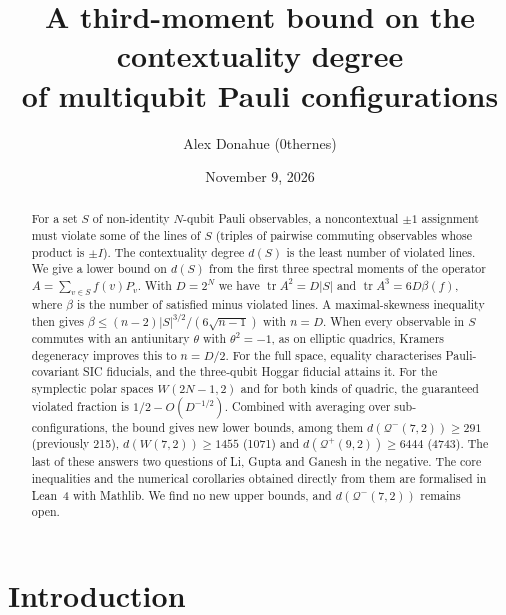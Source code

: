 \documentclass[aps,pra,onecolumn,11pt,superscriptaddress,nofootinbib]{revtex4-2}
\theoremstyle{definition}
\theoremstyle{remark}
\newcommand{\tr}{\operatorname{tr}}
\newcommand{\Qp}{\mathcal{Q}^{+}}
\newcommand{\Qm}{\mathcal{Q}^{-}}
\begin{document}
\title{A third-moment bound on the contextuality degree\\ of multiqubit Pauli configurations}

\author{Alex Donahue (0thernes)}

\date{November 9, 2026}

\begin{abstract}
For a set $S$ of non-identity $N$-qubit Pauli observables, a noncontextual $\pm1$ assignment
must violate some of the lines of $S$ (triples of pairwise commuting observables whose product
is $\pm I$). The contextuality degree $d(S)$ is the least number of violated lines.
We give a lower bound on $d(S)$ from the first three spectral moments of the operator
$A=\sum_{v\in S} f(v)P_v$. With $D=2^N$ we have $\tr A^2=D|S|$ and $\tr A^3=6D\beta(f)$,
where $\beta$ is the number of satisfied minus violated lines. A maximal-skewness
inequality then gives $\beta\le (n-2)|S|^{3/2}/(6\sqrt{n-1})$ with $n=D$. When every
observable in $S$ commutes with an antiunitary $\theta$ with $\theta^2=-1$, as on elliptic
quadrics, Kramers degeneracy improves this to $n=D/2$. For the full space, equality
characterises Pauli-covariant SIC fiducials, and the three-qubit Hoggar fiducial attains it.
For the symplectic polar spaces $W(2N-1,2)$ and for both kinds of quadric, the guaranteed
violated fraction is $1/2-O(D^{-1/2})$. Combined with averaging over sub-configurations, the
bound gives new lower bounds, among them $d(\Qm(7,2))\ge 291$ (previously 215),
$d(W(7,2))\ge 1455$ (1071) and $d(\Qp(9,2))\ge 6444$ (4743). The last of these answers two
questions of Li, Gupta and Ganesh in the negative. The core inequalities and the numerical
corollaries obtained directly from them are formalised in Lean~4 with Mathlib. We find no new
upper bounds, and $d(\Qm(7,2))$ remains open.
\end{abstract}

\maketitle

\section{Introduction}
\end{document}
